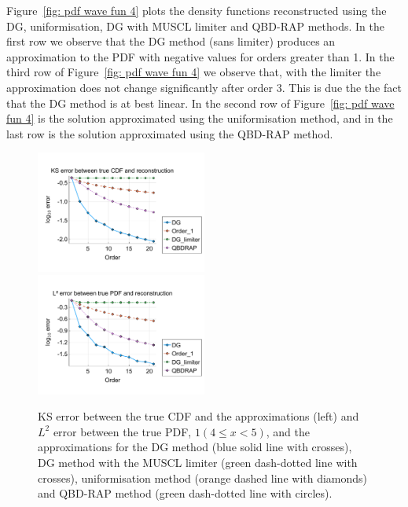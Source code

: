 \begin{example}
Figure~\ref{fig: pdf wave fun 4} plots the density functions reconstructed using the DG, uniformisation, DG with MUSCL limiter and QBD-RAP methods. In the first row we observe that the DG method (sans limiter) produces an approximation to the PDF with negative values for orders greater than 1. In the third row of Figure~\ref{fig: pdf wave fun 4} we observe that, with the limiter the approximation does not change significantly after order 3. This is due the the fact that the DG method is at best linear. In the second row of Figure~\ref{fig: pdf wave fun 4} is the solution approximated using the uniformisation method, and in the last row is the solution approximated using the QBD-RAP method. 
\begin{figure}
	\centering
	\includegraphics[width=0.5\textwidth,trim={0.75cm 0.8cm 0.25cm 1.25cm},clip]{chapter6/figs/wave/fun4/meshs_ks_error_formatted.pdf}%
	\includegraphics[width=0.5\textwidth,trim={0.75cm 0.8cm 0.25cm 1.25cm},clip]{chapter6/figs/wave/fun4/meshs_l2_pdf_error_formatted.pdf}
	\caption{KS error between the true CDF and the approximations (left) and \(L^2\) error between the true PDF, \(1(4\leq x < 5)\), and the approximations for the DG method (blue solid line with crosses), DG method with the MUSCL limiter (green dash-dotted line with crosses), uniformisation method (orange dashed line with diamonds) and QBD-RAP method (green dash-dotted line with circles).} 
	\label{fig: fun 4 wave} 
\end{figure}
\begin{figure}
	\centering

\end{figure}
\end{example}
